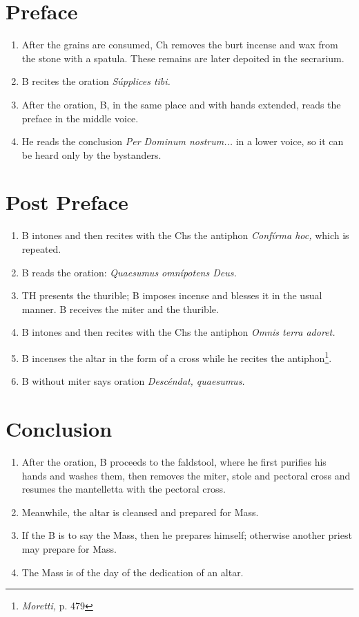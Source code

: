 \documentclass[letterpaper, twocolumn]{article}
\begin{document}
\section*{Preface}
\begin{enumerate}
	\item After the grains are consumed, Ch removes the burt incense and wax from the stone with a spatula. These remains are later depoited in the secrarium.
	\item B recites the oration \textit{Súpplices tibi.}
	\item After the oration, B, in the same place and with hands extended, reads the preface in the middle voice.
	\item He reads the conclusion \textit{Per Dominum nostrum...} in a lower voice, so it can be heard only by the bystanders.
\end{enumerate}
\section*{Post Preface}
\begin{enumerate}
	\item B intones and then recites with the Chs the antiphon \textit{Confírma hoc,} which is repeated.
	\item B reads the oration: \textit{Quaesumus omnípotens Deus.}
	\item TH presents the thurible; B imposes incense and blesses it in the usual manner. B receives the miter and the thurible.
	\item B intones and then recites with the Chs the antiphon \textit{Omnis terra adoret.}
	\item B incenses the altar in the form of a cross while he recites the antiphon\footnote{\textit{Moretti,} p. 479}.
	\item B without miter says oration \textit{Descéndat, quaesumus.}
\end{enumerate}
\section*{Conclusion}
\begin{enumerate}
	\item After the oration, B proceeds to the faldstool, where he first purifies his hands and washes them, then removes the miter, stole and pectoral cross and resumes the mantelletta with the pectoral cross.
	\item Meanwhile, the altar is cleansed and prepared for Mass.
	\item If the B is to say the Mass, then he prepares himself; otherwise another priest may prepare for Mass.
	\item The Mass is of the day of the dedication of an altar.
\end{enumerate}
\end{document}
